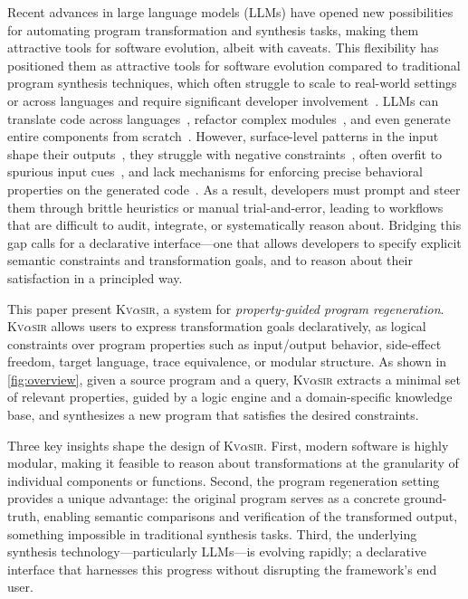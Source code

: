 \documentclass[nonacm,sigplan,review]{acmart}
\newcommand{\sys}{{\scshape Kv{$\alpha$}sir}\xspace}
\begin{document}
Recent advances in large language models (LLMs) have opened new possibilities for automating program transformation and synthesis tasks, making them attractive tools for software evolution, albeit with caveats.
This flexibility has positioned them as attractive tools for software evolution
compared to traditional program synthesis techniques, which often struggle
to scale to real-world settings or across languages and require significant developer involvement~\cite{reynolds2019syguscomp,leino2016dafny,wu2023programming,dynamoth2016,cambronero2019active}.
LLMs can translate code across languages~\cite{ou2025enhancingllmbasedcodetranslation},
refactor complex modules~\cite{ziftci2025migrating},
and even generate entire components from scratch~\cite{huynh2025largelanguagemodelscode}.
However, surface-level patterns in the input shape their outputs~\cite{yang2025evaluatinggeneralizationcapabilitieslarge},
they struggle with negative constraints~\cite{hwang2024thinkpinkelephant,jiang2024llmsdreamelephantswhen},
often overfit to spurious input cues~\cite{xu2023llmfoolitselfpromptbased, wu2023deceptpromptexploitingllmdrivencode},
and lack mechanisms for enforcing precise behavioral properties on the generated code~\cite{roh2025breakthechainreasoningfailuresllms}.
As a result, developers must prompt and steer them through brittle heuristics or manual trial-and-error, leading to workflows that are difficult to audit, integrate, or systematically reason about.
Bridging this gap calls for a declarative interface---one that allows developers to specify explicit semantic constraints and transformation goals, and to reason about their satisfaction in a principled way.

This paper present \sys, a system for \emph{property-guided program regeneration}.
\sys allows users
to express transformation goals declaratively, as logical constraints over
program properties such as input/output behavior, side-effect freedom, target
language, trace equivalence, or modular structure.
As shown in \cref{fig:overview}, given a source program and
a query, \sys extracts a minimal set of relevant properties, guided by a
logic engine and a domain-specific knowledge base, and synthesizes a new
program that satisfies the desired constraints.

Three key insights shape the design of \sys.
First, modern software is highly modular, making it feasible to reason about transformations at the granularity of individual components or functions.
Second, the program regeneration setting provides a unique advantage: the original program serves as a concrete ground-truth, enabling semantic comparisons and verification of the transformed output, something impossible in traditional synthesis tasks.
Third, the underlying synthesis technology---particularly LLMs---is evolving rapidly; a declarative interface that harnesses this progress without disrupting the framework's end user.
\end{document}
